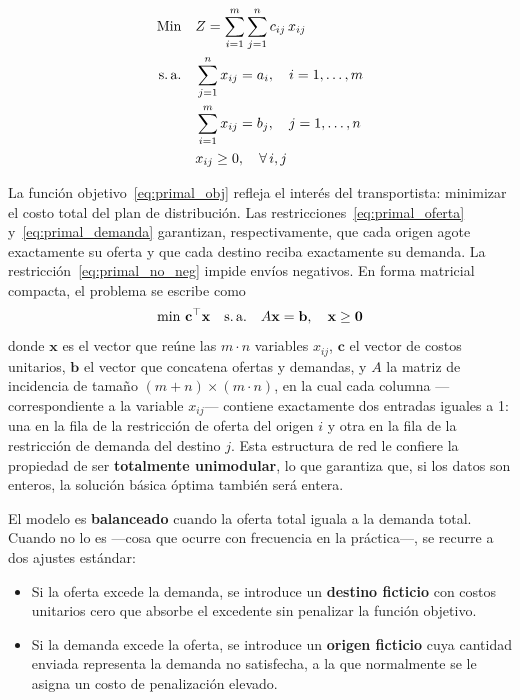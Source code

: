 \documentclass[10pt,letterpaper,twocolumn]{article}
\begin{document}
\begin{align}
\text{Min}\quad & Z = \sum_{i=1}^{m}\sum_{j=1}^{n} c_{ij}\,x_{ij} \label{eq:primal_obj} \\
\text{s.\,a.}\quad & \sum_{j=1}^{n} x_{ij} = a_i, \quad i = 1,\ldots,m \label{eq:primal_oferta}\\
                   & \sum_{i=1}^{m} x_{ij} = b_j, \quad j = 1,\ldots,n \label{eq:primal_demanda}\\
                   & x_{ij} \geq 0, \quad \forall\, i, j \label{eq:primal_no_neg}
\end{align}

La función objetivo~\eqref{eq:primal_obj} refleja el interés del transportista: minimizar el costo total del plan de distribución. Las restricciones~\eqref{eq:primal_oferta} y~\eqref{eq:primal_demanda} garantizan, respectivamente, que cada origen agote exactamente su oferta y que cada destino reciba exactamente su demanda. La restricción~\eqref{eq:primal_no_neg} impide envíos negativos. En forma matricial compacta, el problema se escribe como
\begin{equation*}
\min \, \mathbf{c}^{\top}\mathbf{x} \quad \text{s.\,a.} \quad A\mathbf{x} = \mathbf{b}, \quad \mathbf{x} \geq \mathbf{0}
\end{equation*}
donde $\mathbf{x}$ es el vector que reúne las $m\cdot n$ variables $x_{ij}$, $\mathbf{c}$ el vector de costos unitarios, $\mathbf{b}$ el vector que concatena ofertas y demandas, y $A$ la matriz de incidencia de tamaño $(m+n) \times (m \cdot n)$, en la cual cada columna —correspondiente a la variable $x_{ij}$— contiene exactamente dos entradas iguales a 1: una en la fila de la restricción de oferta del origen $i$ y otra en la fila de la restricción de demanda del destino $j$. Esta estructura de red le confiere la propiedad de ser \textbf{totalmente unimodular}, lo que garantiza que, si los datos son enteros, la solución básica óptima también será entera.

El modelo es \textbf{balanceado} cuando la oferta total iguala a la demanda total. Cuando no lo es ---cosa que ocurre con frecuencia en la práctica---, se recurre a dos ajustes estándar:

\begin{itemize}
\item Si la oferta excede la demanda, se introduce un \textbf{destino ficticio} con costos unitarios cero que absorbe el excedente sin penalizar la función objetivo.
\item Si la demanda excede la oferta, se introduce un \textbf{origen ficticio} cuya cantidad enviada representa la demanda no satisfecha, a la que normalmente se le asigna un costo de penalización elevado.
\end{itemize}
\end{document}

